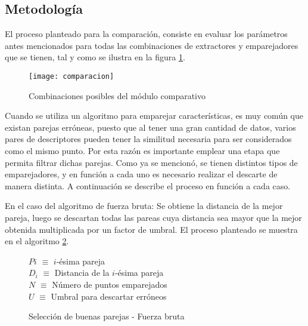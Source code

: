 \subsection{Metodología}

El proceso planteado para la comparación, consiste en evaluar los parámetros antes mencionados para todas las combinaciones de extractores y emparejadores que se tienen, tal y como se ilustra en la figura \ref{imagen:comparacion}.

\begin{figure}[H]
	\centering
	\texttt{[image: comparacion]}
	\caption[Combinación de algoritmos para el analisis de rendimiento]{Combinaciones posibles del módulo comparativo}
	\label{imagen:comparacion}
\end{figure}

Cuando se utiliza un algoritmo para emparejar características, es muy común que existan parejas erróneas, puesto que al tener una gran cantidad de datos, varios pares de descriptores pueden tener la similitud necesaria para ser considerados como el mismo punto. Por esta razón es importante emplear una etapa que permita filtrar dichas parejas. Como ya se mencionó, se tienen distintos tipos de emparejadores, y en función a cada uno es necesario realizar el descarte de manera distinta. A continuación se describe el proceso en función a cada caso.

En el caso del algoritmo de fuerza bruta: Se obtiene la distancia de la mejor pareja, luego se descartan todas las pareas cuya distancia sea mayor que la mejor obtenida multiplicada por un factor de umbral. El proceso planteado se muestra en el algoritmo \ref{fuerzabruta}.

\begin{figure}[h]
	\centering
	\begin{minipage}{.7\linewidth}
		\begin{algorithm}[H] %
			\caption{Selección de buenas parejas - Fuerza bruta}
			\label{fuerzabruta}
			\SetAlgoLined
			$P{i}$ $\equiv$  $i$-ésima pareja\\
			$D_{i}$ $\equiv$ Distancia de la $i$-ésima pareja\\
			$N$ $\equiv$ Número de puntos emparejados\\
			$U$ $\equiv$ Umbral para descartar erróneos\\
		\end{algorithm}
	\end{minipage}
\end{figure}

